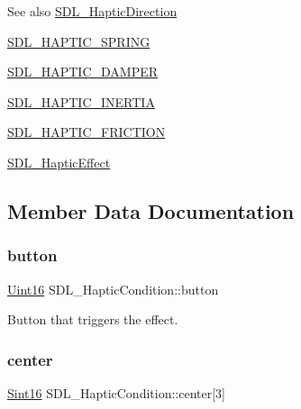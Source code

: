\begin{DoxySeeAlso}{See also}
\hyperlink{struct_s_d_l___haptic_direction}{S\+D\+L\+\_\+\+Haptic\+Direction} 

\hyperlink{_s_d_l__haptic_8h_a3b52d4700380085e2b5d87bb20320fb1}{S\+D\+L\+\_\+\+H\+A\+P\+T\+I\+C\+\_\+\+S\+P\+R\+I\+NG} 

\hyperlink{_s_d_l__haptic_8h_a69522f261973e3ea4273486141320a87}{S\+D\+L\+\_\+\+H\+A\+P\+T\+I\+C\+\_\+\+D\+A\+M\+P\+ER} 

\hyperlink{_s_d_l__haptic_8h_a14b807471589120395aec28293cf6642}{S\+D\+L\+\_\+\+H\+A\+P\+T\+I\+C\+\_\+\+I\+N\+E\+R\+T\+IA} 

\hyperlink{_s_d_l__haptic_8h_a98a5011311168d63921aaac21403a4d8}{S\+D\+L\+\_\+\+H\+A\+P\+T\+I\+C\+\_\+\+F\+R\+I\+C\+T\+I\+ON} 

\hyperlink{union_s_d_l___haptic_effect}{S\+D\+L\+\_\+\+Haptic\+Effect} 
\end{DoxySeeAlso}


\subsection{Member Data Documentation}
\mbox{\label{struct_s_d_l___haptic_condition_acd35a9d432ad122bf7824b16974eac7a}} 
\subsubsection{\texorpdfstring{button}{button}}
{\footnotesize\ttfamily \hyperlink{_s_d_l__stdinc_8h_a31fcc0a076c9068668173ee26d33e42b}{Uint16} S\+D\+L\+\_\+\+Haptic\+Condition\+::button}

Button that triggers the effect. \mbox{\label{struct_s_d_l___haptic_condition_a8a71ec28ff5ab85246cbc59736aa2c53}} 
\subsubsection{\texorpdfstring{center}{center}}
{\footnotesize\ttfamily \hyperlink{_s_d_l__stdinc_8h_a9d0257032c0e146ab6121bf0122712f5}{Sint16} S\+D\+L\+\_\+\+Haptic\+Condition\+::center\mbox{[}3\mbox{]}}

